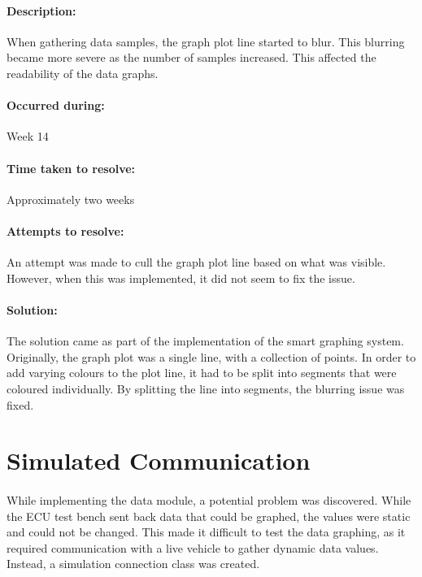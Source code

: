 {{{			\paragraph{Description:}
			When gathering data samples, the graph plot line started to blur. This blurring became more severe as the number of samples increased. This affected the readability of the data graphs.
			\paragraph{Occurred during:}
			Week 14
			\paragraph{Time taken to resolve:}
			Approximately two weeks
			\paragraph{Attempts to resolve:}
			An attempt was made to cull the graph plot line based on what was visible. However, when this was implemented, it did not seem to fix the issue. 
			\paragraph{Solution:}
			The solution came as part of the implementation of the smart graphing system. Originally, the graph plot was a single line, with a collection of points. In order to add varying colours to the plot line, it had to be split into segments that were coloured individually. By splitting the line into segments, the blurring issue was fixed.
		}
	}
	\label{ssec:DataModuleIssues}

\section{Simulated Communication}
		\paragraph{}{
		While implementing the data module, a potential problem was discovered. While the ECU test bench sent back data that could be graphed, the values were static and could not be changed. This made it difficult to test the data graphing, as it required communication with a live vehicle to gather dynamic data values. Instead, a simulation connection class was created.
		}
}
